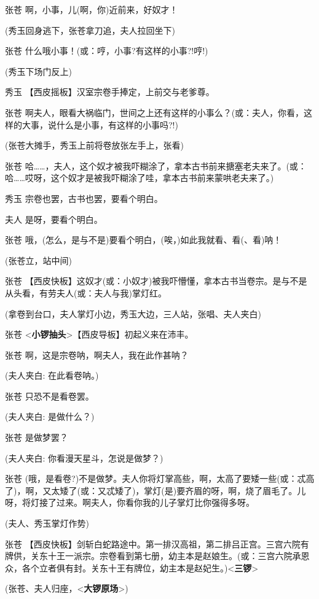 张苍 啊，小事，儿(啊，你)近前来，好奴才！

(秀玉回身逃下，张苍拿刀追，夫人拉回坐下)

张苍 什么哦小事！(或：哼，小事?有这样的小事?!哼!)

(秀玉下场门反上)

秀玉 【西皮摇板】汉室宗卷手捧定，上前交与老爹尊。

张苍
啊夫人，眼看大祸临门，世间之上还有这样的小事么？(或：夫人，你看，这样的大事，说什么是小事，有这样的小事吗?!)

(张苍大摊手，秀玉上前将卷放张左手上，张看)

张苍
哈\ldots{}\ldots{}，夫人，这个奴才被我吓糊涂了，拿本古书前来搪塞老夫来了。(或：哈\ldots{}\ldots{}哎呀，这个奴才是被我吓糊涂了哇，拿本古书前来蒙哄老夫来了。)

秀玉 宗卷也罢，古书也罢，要看个明白。

夫人 是呀，要看个明白。

张苍 哦，(怎么，是与不是)要看个明白，(唉，)如此我就看、看(、看)呐！

(张苍立，站中间)

张苍
【西皮快板】这奴才(或：小奴才)被我吓懵懂，拿本古书当卷宗。是与不是从头看，有劳夫人(或：夫人与我)掌灯红。

(拿卷到台口，夫人掌灯小边，秀玉大边，三人站，张唱、夫人夹白)

张苍
\textless{}\textbf{小锣抽头}\textgreater{}【西皮导板】初起义来在沛丰。

张苍 啊，这是宗卷呐，啊夫人，我在此作甚呐？

(夫人夹白: 在此看卷呐。)

张苍 只恐不是看卷罢。

(夫人夹白: 是做什么？)

张苍 是做梦罢？

(夫人夹白: 你看漫天星斗，怎说是做梦？)

张苍
(哦，是看卷?)不是做梦。夫人你将灯掌高些，啊，太高了要矮一些(或：忒高了)，啊，又太矮了(或：又忒矮了)，掌灯(是)要齐眉的呀，啊，烧了眉毛了。儿呀，将灯接了过来。啊夫人，你看你我的儿子掌灯比你强得多呀。

(夫人、秀玉掌灯作势)

张苍
【西皮快板】剑斩白蛇路途中。第一排汉高祖，第二排吕正宫。三宫六院有牌供，关东十王一派宗。宗卷看到第七册，幼主本是赵娘生。(或：三宫六院承恩众，各个立者俱有封。关东十王有牌位，幼主本是赵妃生。)\textless{}\textbf{三锣}\textgreater{}

(张苍、夫人归座，\textless{}\textbf{大锣原场}\textgreater{})

